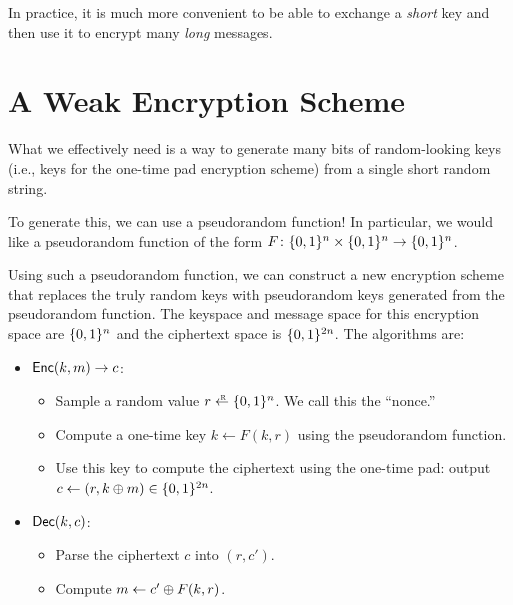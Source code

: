 In practice, it is much more convenient to be able to exchange a \emph{short}
key and then use it to encrypt many \emph{long} messages.

\section{A Weak Encryption Scheme}\label{sec:lec8:weakenc}
What we effectively need is a way to generate many bits of random-looking keys 
(i.e., keys for the one-time pad encryption scheme)
from a single short random string.

To generate this, we can use a pseudorandom function! 
In particular, we would like a pseudorandom 
function of the form $F \colon \{0,1\}^n \times \{0,1\}^n \rightarrow \{0,1\}^n$. 

Using such a pseudorandom function, we can construct a new 
encryption scheme that replaces the truly random keys 
with pseudorandom keys generated from the pseudorandom function.
The keyspace and message space for this encryption space are $\{0,1\}^n$
and the ciphertext space is $\{0,1\}^{2n}$.
The algorithms are:
\begin{itemize}
	\item $\mathsf{Enc}(k, m) \to c$:
      \begin{itemize}
        \item Sample a random value $r \rgets \bin^n$.
              We call this the ``nonce.''
        \item Compute a one-time key $k \gets F(k, r)$ using the pseudorandom function.
        \item Use this key to compute the ciphertext using the one-time pad: 
          output $c \gets (r, k \oplus m) \in \{0,1\}^{2n}$.
      \end{itemize}
	\item $\mathsf{Dec}(k, c)$:
        \begin{itemize}
          \item Parse the ciphertext $c$ into $(r, c')$.
          \item Compute $m \gets c' \oplus F(k, r)$.
        \end{itemize}
\end{itemize}

